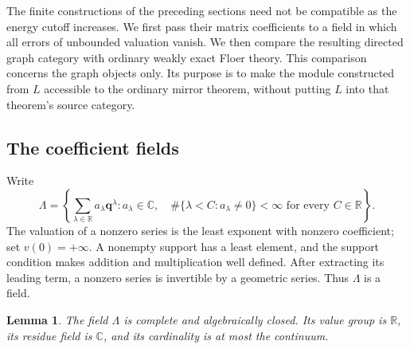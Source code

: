 \documentclass[11pt]{article}
\newtheorem{lemma}[theorem]{Lemma}
\theoremstyle{definition}
\theoremstyle{remark}
\numberwithin{equation}{section}
\begin{document}
The finite constructions of the preceding sections need not be compatible
as the energy cutoff increases.  We first pass their matrix coefficients
to a field in which all errors of unbounded valuation vanish.  We then
compare the resulting directed graph category with ordinary weakly exact
Floer theory.  This comparison concerns the graph objects only.  Its
purpose is to make the module constructed from \(L\) accessible to the
ordinary mirror theorem, without putting \(L\) into that theorem's
source category.

\subsection{The coefficient fields}

Write
\[
 \Lambda=
 \left\{\sum_{\lambda\in\mathbb R}a_\lambda\mathbf q^\lambda:
 a_\lambda\in\mathbb C,\quad
 \#\{\lambda<C:a_\lambda\ne0\}<\infty
 \text{ for every }C\in\mathbb R\right\}.
\]
The valuation of a nonzero series is the least exponent with nonzero
coefficient; set \(v(0)=+\infty\).  A nonempty support has a least element,
and the support condition makes addition and multiplication well defined.
After extracting its leading term, a nonzero series is invertible by a
geometric series.  Thus \(\Lambda\) is a field.

\begin{lemma}\label{cat:novikov}
The field \(\Lambda\) is complete and algebraically closed.  Its value group
is \(\mathbb R\), its residue field is \(\mathbb C\), and its cardinality is at most the
continuum.
\end{lemma}
\end{document}
